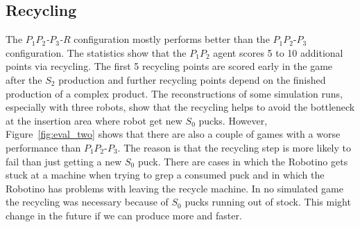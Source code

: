 \subsection{Recycling}
The \textit{$P_1P_2$-$P_3$-$R$} configuration mostly performs better than the $P_1P_2$-$P_3$ configuration. The statistics show that the $P_1P_2$ agent scores 5 to 10 additional points via recycling. The first 5 recycling points are scored early in the game after the $S_2$ production and further recycling points depend on the finished production of a complex product. The reconstructions of some simulation runs, especially with three robots, show that the recycling helps to avoid the bottleneck at the insertion area where robot get new $S_0$ pucks. However, Figure~\ref{fig:eval_two} shows that there are also a couple of games with a worse performance than $P_1P_2$-$P_3$. The reason is that the recycling step is more likely to fail than just getting a new $S_0$ puck. There are cases in which the Robotino gets stuck at a machine when trying to grep a consumed puck and in which the Robotino has problems with leaving the recycle machine. In no simulated game the recycling was necessary because of $S_0$ pucks running out of stock. This might change in the future if we can produce more and faster.

